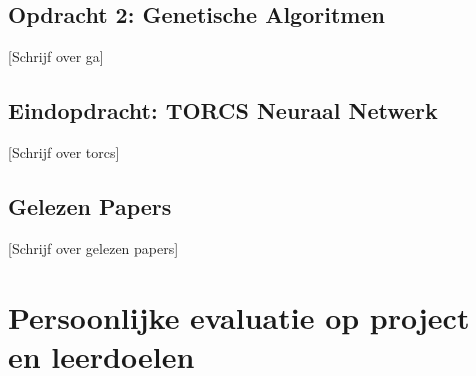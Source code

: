 \documentclass{article} %
\begin{document}
        \newpage

        \subsection{Opdracht 2: Genetische Algoritmen}
        
            [Schrijf over ga]
    
        \newpage

        \subsection{Eindopdracht: TORCS Neuraal Netwerk}
        
            [Schrijf over torcs]
    
        \newpage
    
        \subsection{Gelezen Papers}
        
            [Schrijf over gelezen papers]
        
        \newpage


    \section{Persoonlijke evaluatie op project en leerdoelen}


    \newpage
\end{document}
